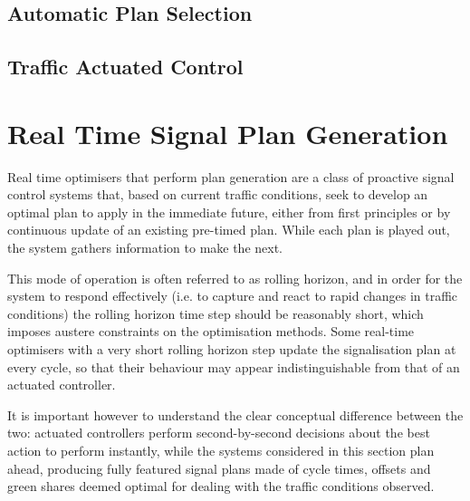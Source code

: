 \subsection{Automatic Plan Selection}

\subsection{Traffic Actuated Control}

\section{Real Time Signal Plan Generation}

Real time optimisers that perform plan generation are a class of proactive signal control systems that, based on current traffic conditions, seek to develop an optimal plan to apply in the immediate future, either from first principles or by continuous update of an existing pre-timed plan. While each plan is played out, the system gathers information to make the next.

This mode of operation is often referred to as rolling horizon, and in order for the system to respond effectively (i.e. to capture and react to rapid changes in traffic conditions) the rolling horizon time step should be reasonably short, which imposes austere constraints on the optimisation methods. Some real-time optimisers with a very short rolling horizon step update the signalisation plan at every cycle, so that their behaviour may appear indistinguishable from that of an actuated controller.

It is important however to understand the clear conceptual difference between the two: actuated controllers perform second-by-second decisions about the best action to perform instantly, while the systems considered in this section plan ahead, producing fully featured signal plans made of cycle times, offsets and green shares deemed optimal for dealing with the traffic conditions observed.

